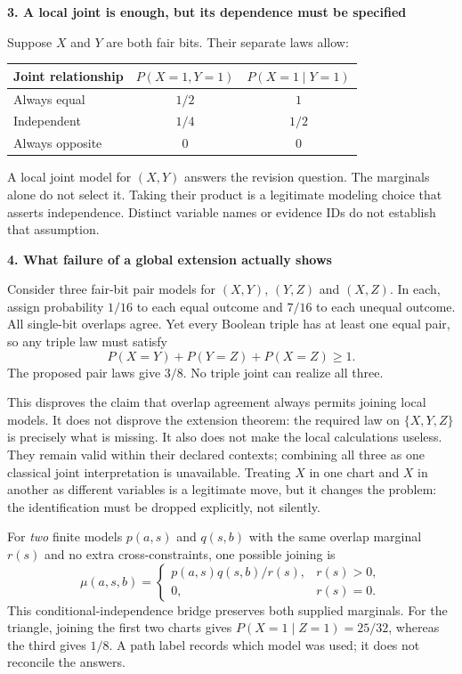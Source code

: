 \documentclass[11pt]{article}
\newcommand{\heading}[1]{\vspace{4pt}\textbf{#1}\par\nopagebreak}
\begin{document}
\heading{3. A local joint is enough, but its dependence must be specified}
Suppose $X$ and $Y$ are both fair bits. Their separate laws allow:
\begin{center}
\begin{tabular}{lcc}
\toprule
Joint relationship & $P(X=1,Y=1)$ & $P(X=1\mid Y=1)$\\
\midrule
Always equal & $1/2$ & $1$\\
Independent & $1/4$ & $1/2$\\
Always opposite & $0$ & $0$\\
\bottomrule
\end{tabular}
\end{center}
A local joint model for $(X,Y)$ answers the revision question. The marginals
alone do not select it. Taking their product is a legitimate modeling choice
that asserts independence. Distinct variable names or evidence IDs do not
establish that assumption.

\heading{4. What failure of a global extension actually shows}
Consider three fair-bit pair models for $(X,Y)$, $(Y,Z)$ and $(X,Z)$. In each,
assign probability $1/16$ to each equal outcome and $7/16$ to each unequal
outcome. All single-bit overlaps agree. Yet every Boolean triple has at least
one equal pair, so any triple law must satisfy
\[
 P(X=Y)+P(Y=Z)+P(X=Z)\geq1.
\]
The proposed pair laws give $3/8$. No triple joint can realize all three.

This disproves the claim that overlap agreement always permits joining local
models. It does not disprove the extension theorem: the required law on
$\{X,Y,Z\}$ is precisely what is missing. It also does not make the local
calculations useless. They remain valid within their declared contexts;
combining all three as one classical joint interpretation is unavailable.
Treating $X$ in one chart and $X$ in another as different variables is a
legitimate move, but it changes the problem: the identification must be
dropped explicitly, not silently.

For \emph{two} finite models $p(a,s)$ and $q(s,b)$ with the same overlap
marginal $r(s)$ and no extra cross-constraints, one possible joining is
\[
 \mu(a,s,b)=\begin{cases}p(a,s)q(s,b)/r(s),&r(s)>0,\\0,&r(s)=0.\end{cases}
\]
This conditional-independence bridge preserves both supplied marginals.
For the triangle, joining the first two charts gives
$P(X=1\mid Z=1)=25/32$, whereas the third gives $1/8$.
A path label records which model was used; it does not reconcile the answers.
\end{document}
